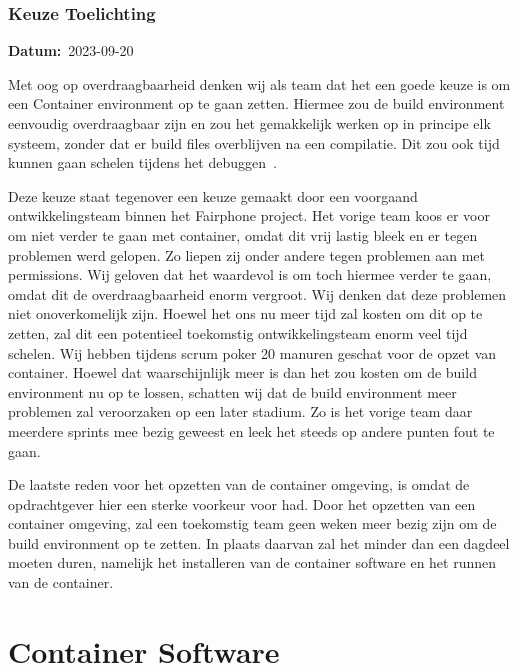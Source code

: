 \documentclass[a4paper]{report}
\newcommand{\personalbox}{
  \begin{tcolorbox}[hbox, colback=green!5!white,colframe=green!75!black,
    left=.1mm, right=.1mm, top=.1mm, bottom=.1mm, fontupper=\scriptsize\sffamily]
    Persoonlijke Keuze
  \end{tcolorbox}
}
\newcommand{\personalchoice}[1]{
  \section[ #1 ]{#1~\mbox{\raisebox{-2.5pt}{\personalbox}}}
}
\newcommand{\timestamp}[1]{
  \mbox{\scriptsize \textbf{Datum:} #1} \smallbreak
}
\begin{document}
\subsubsection{Keuze Toelichting}
\timestamp{2023-09-20}
Met oog op overdraagbaarheid denken wij als team dat het een goede keuze is om een Container environment op te gaan zetten. 
Hiermee zou de build environment eenvoudig overdraagbaar zijn en zou het gemakkelijk werken op in principe elk systeem, zonder dat er build files overblijven na een compilatie.
Dit zou ook tijd kunnen gaan schelen tijdens het debuggen~\cite{AffinityBridgeDockerProsCons}. 
\par\smallskip
Deze keuze staat tegenover een keuze gemaakt door een voorgaand ontwikkelingsteam binnen het Fairphone project. 
Het vorige team koos er voor om niet verder te gaan met container, omdat dit vrij lastig bleek en er tegen problemen werd gelopen. 
Zo liepen zij onder andere tegen problemen aan met permissions.
Wij geloven dat het waardevol is om toch hiermee verder te gaan, omdat dit de overdraagbaarheid enorm vergroot. Wij denken dat deze problemen niet onoverkomelijk zijn.
Hoewel het ons nu meer tijd zal kosten om dit op te zetten, zal dit een potentieel toekomstig ontwikkelingsteam enorm veel tijd schelen.
Wij hebben tijdens scrum poker 20 manuren geschat voor de opzet van container. Hoewel dat waarschijnlijk meer is dan het zou kosten om de build environment nu op te lossen, schatten wij dat de build environment meer problemen zal veroorzaken op een later stadium. 
Zo is het vorige team daar meerdere sprints mee bezig geweest en leek het steeds op andere punten fout te gaan.

\par\smallskip
De laatste reden voor het opzetten van de container omgeving, is omdat de opdrachtgever hier een sterke voorkeur voor had. Door het opzetten van een container omgeving, zal een toekomstig team geen weken meer bezig zijn om de build environment op te zetten. In plaats daarvan zal het minder dan een dagdeel moeten duren, namelijk het installeren van de container software en het runnen van de container.

\personalchoice{Container Software}
\end{document}
